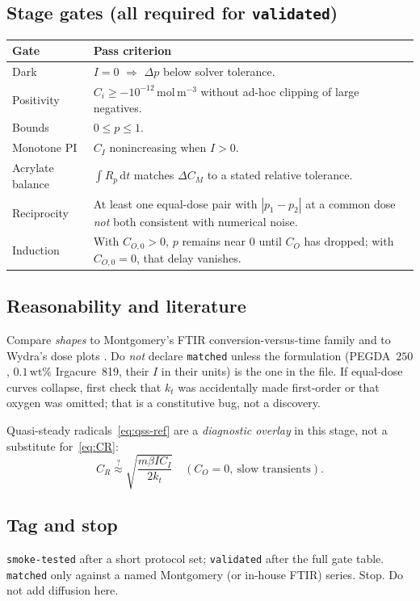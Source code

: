 \documentclass[11pt,a4paper]{article}
\newcommand{\tagsmoke}{\texttt{smoke-tested}}
\newcommand{\tagvalid}{\texttt{validated}}
\newcommand{\tagmatch}{\texttt{matched}}
\begin{document}
\subsection{Stage gates (all required for \tagvalid)}
\begin{center}
\small
\begin{tabular}{@{}p{3.2cm}p{10.2cm}@{}}
\toprule
Gate & Pass criterion \\
\midrule
Dark & $I=0$ $\Rightarrow$ $\Delta p$ below solver tolerance. \\
Positivity & $C_i \ge -10^{-12}\,\mathrm{mol\,m^{-3}}$ without ad-hoc clipping of large negatives. \\
Bounds & $0\le p\le 1$. \\
Monotone PI & $C_I$ nonincreasing when $I>0$. \\
Acrylate balance & $\int R_p\,\mathrm{d}t$ matches $\Delta C_M$ to a stated relative tolerance. \\
Reciprocity & At least one equal-dose pair with $|p_1-p_2|$ at a common dose \emph{not} both consistent with numerical noise. \\
Induction & With $C_{O,0}>0$, $p$ remains near $0$ until $C_O$ has dropped; with $C_{O,0}=0$, that delay vanishes. \\
\bottomrule
\end{tabular}
\end{center}

\subsection{Reasonability and literature}
Compare \emph{shapes} to Montgomery's FTIR conversion-versus-time family \citep{Montgomery2022} and to Wydra's dose plots \citep{Wydra2014}.
Do \emph{not} declare \tagmatch{} unless the formulation (PEGDA~$250$, $0.1\,\mathrm{wt\%}$ Irgacure~819, their $I$ in their units) is the one in the file.
If equal-dose curves collapse, first check that $k_t$ was accidentally made first-order or that oxygen was omitted; that is a constitutive bug, not a discovery.

Quasi-steady radicals~\eqref{eq:qss-ref} are a \emph{diagnostic overlay} in this stage, not a substitute for~\eqref{eq:CR}:
\begin{equation}
  C_R \stackrel{?}{\approx} \sqrt{\frac{m\beta I C_I}{2k_t}}\quad (C_O=0,\ \text{slow transients}).
  \label{eq:qss-ref}
\end{equation}

\subsection{Tag and stop}
\tagsmoke{} after a short protocol set; \tagvalid{} after the full gate table.
\tagmatch{} only against a named Montgomery (or in-house FTIR) series.
Stop. Do not add diffusion here.
\end{document}

